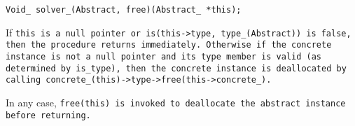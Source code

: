 
\tt{Void_ solver_(Abstract, free)(Abstract_ *this);}


If \tt{this} is a null pointer or \tt{is(this->type, type_(Abstract))}
is \tt{false}, then the procedure returns immediately.
Otherwise if the concrete instance is not a null pointer and its \tt{type}
member is valid (as determined by \tt{is_type}), then the concrete instance
is deallocated by calling \tt{concrete_(this)->type->free(this->concrete_)}.

In any case, \tt{free(this)} is invoked to
deallocate the abstract instance before returning.
